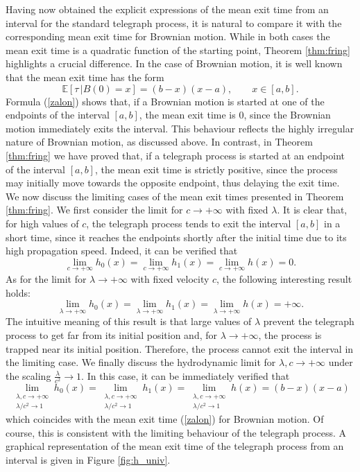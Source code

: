 \documentclass{article}
\begin{document}
\noindent Having now obtained the explicit expressions of the mean exit time from an interval for the standard telegraph process, it is natural to compare it with the corresponding mean exit time for Brownian motion. While in both cases the mean exit time is a quadratic function of the starting point, Theorem \ref{thm:fring} highlights a crucial difference. In the case of Brownian motion, it is well known that the mean exit time has the form
\begin{equation}\label{zalon}\mathbb{E}\left[\tau\,\Big\lvert B(0)=x\right]=(b-x)(x-a),\qquad x\in[a,b].\end{equation}
Formula (\ref{zalon}) shows that, if a Brownian motion is started at one of the endpoints of the interval $[a,b]$, the mean exit time is 0, since the Brownian motion immediately exits the interval. This behaviour reflects the highly irregular nature of Brownian motion, as discussed above. In contrast, in Theorem \ref{thm:fring} we have proved that, if a telegraph process is started at an endpoint of the interval $[a,b]$, the mean exit time is strictly positive, since the process may initially move towards the opposite endpoint, thus delaying the exit time. We now discuss the limiting cases of the mean exit times presented in Theorem \ref{thm:fring}. We first consider the limit for $c\to+\infty$ with fixed $\lambda$. It is clear that, for high values of $c$, the telegraph process tends to exit the interval $[a,b]$ in a short time, since it reaches the endpoints shortly after the initial time due to its high propagation speed. Indeed, it can be verified that $$\lim_{c\to+\infty}h_0(x)=\lim_{c\to+\infty}h_1(x)=\lim_{c\to+\infty}h(x)=0.$$ As for the limit for $\lambda\to+\infty$ with fixed velocity $c$, the following interesting result holds:
$$\lim_{\lambda\to+\infty}h_0(x)=\lim_{\lambda\to+\infty}h_1(x)=\lim_{\lambda\to+\infty}h(x)=+\infty.$$ The intuitive meaning of this result is that large values of $\lambda$ prevent the telegraph process to get far from its initial position and, for $\lambda\to+\infty$, the process is trapped near its initial position. Therefore, the process cannot exit the interval in the limiting case. We finally discuss the hydrodynamic limit for $\lambda,c\to+\infty$ under the scaling $\frac{\lambda}{c^2}\to1$. In this case, it can be immediately verified that
$$\lim_{\substack{\lambda,c\to+\infty\\\lambda/c^2\to1}}h_0(x)=\lim_{\substack{\lambda,c\to+\infty\\\lambda/c^2\to1}}h_1(x)=\lim_{\substack{\lambda,c\to+\infty\\\lambda/c^2\to1}}h(x)=(b-x)(x-a)$$ which coincides with the mean exit time (\ref{zalon}) for Brownian motion. Of course, this is consistent with the limiting behaviour of the telegraph process. A graphical representation of the mean exit time of the telegraph process from an interval is given in Figure \ref{fig:h_univ}.
\end{document}

